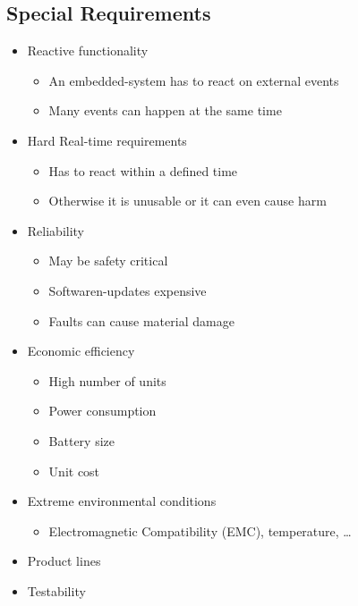 \subsection{Special Requirements}
\begin{itemize}
  \item Reactive functionality
        \begin{itemize}
          \item An embedded-system has to react on external events
          \item Many events can happen at the same time
        \end{itemize}
  \item Hard Real-time requirements
        \begin{itemize}
          \item Has to react within a defined time
          \item Otherwise it is unusable or it can even cause harm
        \end{itemize}
  \item Reliability
        \begin{itemize}
          \item May be safety critical
          \item Softwaren-updates expensive
          \item Faults can cause material damage
        \end{itemize}
  \item Economic efficiency
        \begin{itemize}
          \item High number of units
          \item Power consumption
          \item Battery size
          \item Unit cost
        \end{itemize}
  \item Extreme environmental conditions
        \begin{itemize}
          \item Electromagnetic Compatibility (EMC), temperature, …
        \end{itemize}
  \item Product lines
  \item Testability
\end{itemize}


